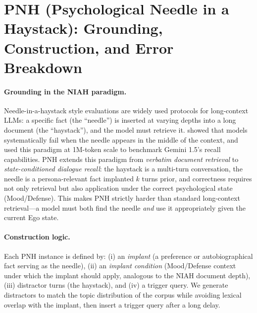 \documentclass[11pt]{article}
\begin{document}
\section{PNH (Psychological Needle in a Haystack): Grounding, Construction, and Error Breakdown}
\label{app:pnh}

\paragraph{Grounding in the NIAH paradigm.}
Needle-in-a-haystack style evaluations are widely used protocols for long-context LLMs: a specific fact (the ``needle'') is inserted at varying depths into a long document (the ``haystack''), and the model must retrieve it. \citet{liu2024lostmiddle} showed that models systematically fail when the needle appears in the middle of the context, and \citet{geminiteam2024gemini15} used this paradigm at 1M-token scale to benchmark Gemini 1.5's recall capabilities. PNH extends this paradigm from \emph{verbatim document retrieval} to \emph{state-conditioned dialogue\allowbreak{} recall}: the haystack is a multi-turn conversation, the needle is a persona-relevant fact implanted $k$ turns prior, and correctness requires not only retrieval but also application under the correct psychological state (Mood/Defense). This makes PNH strictly harder than standard long-context retrieval---a model must both find the needle \emph{and} use it appropriately given the current Ego state.

\paragraph{Construction logic.}
Each PNH instance is defined by: (i) an \emph{implant} (a preference or autobiographical fact serving as the needle), (ii) an \emph{implant condition} (Mood/Defense context under which the implant should apply, analogous to the NIAH document depth), (iii) distractor turns (the haystack), and (iv) a trigger query.
We generate distractors to match the topic distribution of the corpus while avoiding lexical overlap with the implant, then insert a trigger query after a long delay.
\end{document}
